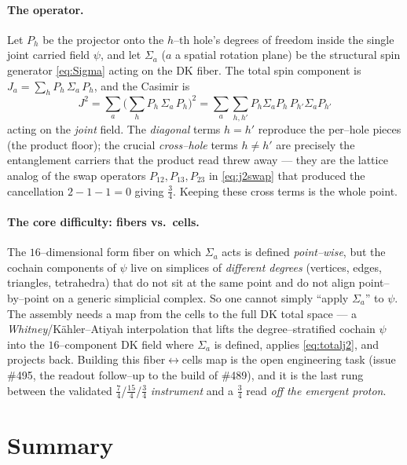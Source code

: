 \documentclass[11pt,oneside]{article}
\begin{document}
\paragraph{The operator.}
Let $P_h$ be the projector onto the $h$--th hole's degrees of freedom inside the
single joint carried field $\psi$, and let $\Sigma_a$ ($a$ a spatial rotation
plane) be the structural spin generator \eqref{eq:Sigma} acting on the DK fiber.
The total spin component is $J_a = \sum_h P_h\,\Sigma_a\,P_h$, and the Casimir is
\begin{equation}
  \boxed{\;J^2 = \sum_a \Big(\sum_h P_h\,\Sigma_a\,P_h\Big)^2
              = \sum_a \sum_{h,h'} P_h\Sigma_a P_h\,P_{h'}\Sigma_a P_{h'}\;}
  \label{eq:totalj2}
\end{equation}
acting on the \emph{joint} field. The \emph{diagonal} terms $h=h'$ reproduce the
per--hole pieces (the product floor); the crucial \emph{cross--hole} terms
$h\neq h'$ are precisely the entanglement carriers that the product read threw
away --- they are the lattice analog of the swap operators
$P_{12},P_{13},P_{23}$ in \eqref{eq:j2swap} that produced the cancellation
$2-1-1=0$ giving $\tfrac34$. Keeping these cross terms is the whole point.

\paragraph{The core difficulty: fibers vs.\ cells.}
The $16$--dimensional form fiber on which $\Sigma_a$ acts is defined
\emph{point--wise}, but the cochain components of $\psi$ live on simplices of
\emph{different degrees} (vertices, edges, triangles, tetrahedra) that do not
sit at the same point and do not align point--by--point on a generic simplicial
complex. So one cannot simply ``apply $\Sigma_a$'' to $\psi$. The assembly
needs a map from the cells to the full DK total space --- a
\emph{Whitney}/K\"ahler--Atiyah interpolation that lifts the degree--stratified
cochain $\psi$ into the $16$--component DK field where $\Sigma_a$ is defined,
applies \eqref{eq:totalj2}, and projects back. Building this fiber$\leftrightarrow$cells
map is the open engineering task (issue \#495, the readout follow--up to the
build of \#489), and it is the last rung between the validated $\tfrac74$/$\tfrac{15}{4}$/$\tfrac34$
\emph{instrument} and a $\tfrac34$ read \emph{off the emergent proton}.

\section{Summary}
\label{sec:summary}
\end{document}
